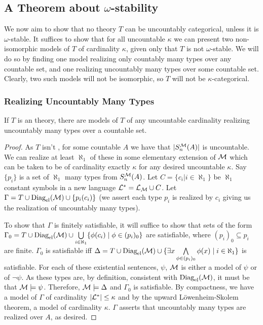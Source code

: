 \subsection{A Theorem about \(\omega\)-stability}
We now aim to show that no theory \(T\) can be uncountably categorical, unless it is \(\omega\)-stable.
It suffices to show that for all uncountable \(\kappa\) we can present two non-isomorphic models of \(T\) of cardinality \(\kappa\), given only that \(T\) is not \(\omega\)-stable.  
We will do so by finding one model realizing only countably many types over any countable set, and one realizing uncountably many types over some countable set. 
Clearly, two such models will not be isomorphic, so \(T\) will not be \(\kappa\)-categorical. 

\subsubsection{Realizing Uncountably Many Types}
\begin{theorem}\label{theorem_realizing_uncountable_types}
If \(T\) is an \omst theory, there are models of \(T\) of any uncountable cardinality realizing uncountably many types over a countable set.
\end{theorem}

\begin{proof}
As \(T\) isn't \omst, for some countable \(A\) we have that \(|S_n^{\mathcal{M}}(A)|\) is uncountable. 
We can realize at least \(\aleph_1\) of these in some elementary extension of \(\mathcal{M}\) which can be taken to be of cardinality exactly \(\kappa\) for any desired uncountable \(\kappa\).
Say \(\{p_i\}\) is a set of \(\aleph_1\) many types from \(S_n^{\mathcal{M}}(A)\).
Let \(C = \{c_i| i \in \aleph_1\} \) be \(\aleph_1\) constant symbols in a new language \(\mathcal{L}^* = \mathcal{L}_{\mathcal{M}} \cup C\). 
Let \(\Gamma = T \cup \text{Diag}_\text{el}(\mathcal{M}) \cup \{p_i(c_i)\}\) (we assert each type \(p_i\) is realized by \(c_i\) giving us the realization of uncountably many types).
 
To show that \(\Gamma\) is finitely satisfiable, it will suffice to show that sets of the form \(\Gamma_0 = T \cup \text{Diag}_\text{el}(\mathcal{M}) \cup \bigcup\limits_{i \in \aleph_1}\{\phi(c_i) \mid \phi \in (p_i)_0\}\) are satisfiable, where \((p_i)_0 \subseteq p_i\) are finite.  
\(\Gamma_0\) is satisfiable iff \(\Delta = T \cup \text{Diag}_\text{el}(\mathcal{M}) \cup \{\exists x \bigwedge\limits_{\phi \in (p_i)_0} \phi(x) \mid i \in \aleph_1\}\) is satisfiable.
For each of these existential sentences, \(\psi\), \(\mathcal{M}\) is either a model of \(\psi\) or of \(\neg \psi\). 
As these types are, by definition, consistent with \(\text{Diag}_\text{el}(\mathcal{M})\), it must be that \(\mathcal{M} \models \psi\). 
Therefore, \(\mathcal{M} \models \Delta\) and \(\Gamma_0\) is satisfiable. 
By compactness, we have a model of \(\Gamma\) of cardinality \(|\mathcal{L}^*| \leq \kappa\) and by the upward L\"owenheim-Skolem theorem, a model of cardinality \(\kappa\).
\(\Gamma\) asserts that uncountably many types are realized over \(A\), as desired. 
\end{proof}

